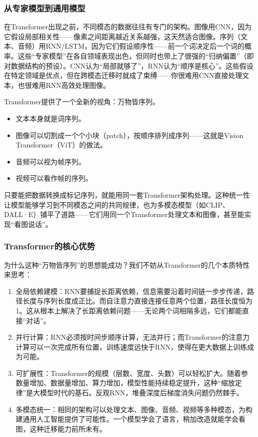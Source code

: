 \documentclass[lang=cn,zihao=-4,a4paper,fontset=windows]{beautybook}
\begin{document}
\subsubsection{从专家模型到通用模型}

在Transformer出现之前，不同模态的数据往往有专门的架构。图像用CNN，因为它假设局部相关性——像素之间距离越近关系越强，这天然适合图像。序列（文本、音频）用RNN/LSTM，因为它们假设顺序性——前一个词决定后一个词的概率。这些“专家模型”在各自领域表现出色，但同时也带上了很强的“归纳偏置”（即对数据结构的预设）。CNN认为“局部就够了”，RNN认为“顺序是核心”。这些假设在特定领域是优点，但在跨模态迁移时就成了束缚——你很难用CNN直接处理文本，也很难用RNN高效处理图像。

Transformer提供了一个全新的视角：万物皆序列。
\begin{itemize}
\item 文本本身就是词序列。
\item 图像可以切割成一个个小块（patch），按顺序排列成序列——这就是Vision Transformer（ViT）的做法。
\item 音频可以视为帧序列。
\item 视频可以看作帧的序列。
\end{itemize}

只要能把数据转换成标记序列，就能用同一套Transformer架构处理。这种统一性让模型能够学习到不同模态之间的共同规律，也为多模态模型（如CLIP、DALL·E）铺平了道路——它们用同一个Transformer处理文本和图像，甚至能实现“看图说话”。

\subsubsection{Transformer的核心优势}

为什么这种“万物皆序列”的思想能成功？我们不妨从Transformer的几个本质特性来思考：
\begin{enumerate}
\item  全局依赖建模：RNN要捕捉长距离依赖，信息需要沿着时间链一步步传递，路径长度与序列长度成正比。而自注意力直接连接任意两个位置，路径长度恒为1。这从根本上解决了长距离依赖问题——无论两个词相隔多远，它们都能直接“对话”。
\item 并行计算：RNN必须按时间步顺序计算，无法并行；而Transformer的注意力计算可以一次完成所有位置，训练速度远快于RNN，使得在更大数据上训练成为可能。
\item 可扩展性：Transformer的规模（层数、宽度、头数）可以轻松扩大。随着参数量增加、数据量增加、算力增加，模型性能持续稳定提升，这种“缩放定律”是大模型时代的基石。反观RNN，堆叠深度后梯度消失问题仍然棘手。
\item 多模态统一：相同的架构可以处理文本、图像、音频、视频等多种模态，为构建通用人工智能提供了可能性。一个模型学会了语言，稍加改造就能学会看图，这种迁移能力前所未有。
\end{enumerate}
\end{document}
